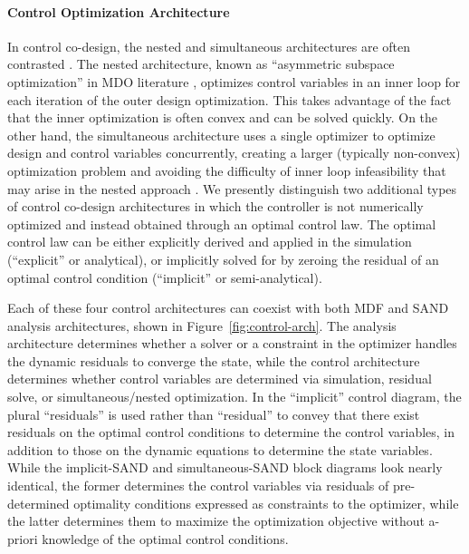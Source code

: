 \paragraph{Control Optimization Architecture}
In control co-design, the nested and simultaneous architectures are often contrasted \cite{sundarrajan_towards_2021,herber_nested_2018}.
The nested architecture, known as ``asymmetric subspace optimization'' in MDO literature \cite{chittick_asymmetric_2009}, optimizes control variables in an inner loop for each iteration of the outer design optimization.
This takes advantage of the fact that the inner optimization is often convex and can be solved quickly.
On the other hand, the simultaneous architecture uses a single optimizer to optimize design and control variables concurrently, creating a larger (typically non-convex) optimization problem and avoiding the difficulty of inner loop infeasibility that may arise in the nested approach \cite{herber_nested_2018}. 
We presently distinguish two additional types of control co-design architectures in which the controller is not numerically optimized and instead obtained through an optimal control law.
The optimal control law can be either explicitly derived and applied in the simulation (``explicit'' or analytical), or implicitly solved for by zeroing the residual of an optimal control condition (``implicit'' or semi-analytical).

Each of these four control architectures can coexist with both MDF and SAND analysis architectures, shown in Figure~\ref{fig:control-arch}.
The analysis architecture determines whether a solver or a constraint in the optimizer handles the dynamic residuals to converge the state, while the control architecture determines whether control variables are determined via simulation, residual solve, or simultaneous/nested optimization.
In the ``implicit'' control diagram, the plural ``residuals'' is used rather than ``residual'' to convey that there exist residuals on the optimal control conditions to determine the control variables, in addition to those on the dynamic equations to determine the state variables.
While the implicit-SAND and simultaneous-SAND block diagrams look nearly identical, the former determines the control variables via residuals of pre-determined optimality conditions expressed as constraints to the optimizer, while the latter determines them to maximize the optimization objective without a-priori knowledge of the optimal control conditions.

